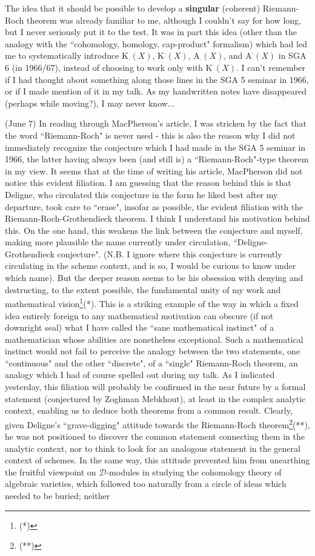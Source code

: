 The idea that it should be possible to develop a \textbf{singular} (coherent) Riemann-Roch theorem was already familiar to me, although I couldn't say for how long, but I never seriously put it to the test. It was in part this idea (other than the analogy with the ``cohomology, homology, cap-product" formalism) which had led me to systematically introduce $\text{K}_\cdot(X)$, $\text{K}^\cdot(X)$, $\text{A}_\cdot(X)$, and $\text{A}^\cdot(X)$  in SGA 6 (in 1966/67), instead of choosing to work only with $\text{K}^\cdot(X)$. I can't remember if I had thought about something along those lines in the SGA 5 seminar in 1966, or if I made mention of it in my talk. As my handwritten notes have disappeared (perhaps while moving?), I may never know...

(June 7) In reading through MacPherson's article, I was stricken by the fact that the word ``Riemann-Roch" is never used - this is also the reason why I did not immediately recognize the conjecture which I had made in the SGA 5 seminar in 1966, the latter having always been (and still is) a ``Riemann-Roch"-type theorem in my view. It seems that at the time of writing his article, MacPherson did not notice this evident filiation. I am guessing that the reason behind this is that Deligne, who circulated this conjecture in the form he liked best after my departure, took care to ``erase", insofar as possible, the evident filiation with the Riemann-Roch-Grothendieck theorem. I think I understand his motivation behind this. On the one hand, this weakens the link between the conjecture and myself, making more plausible  the name currently under circulation, ``Deligne-Grothendieck conjecture". (N.B. I ignore where this conjecture is currently circulating in the scheme context, and is so, I would be curious to know under which name). But the deeper reason seems to be his obsession with denying and destructing, to the extent possible, the fundamental unity of my work and mathematical vision\footnote{(*)}(*). This is a striking example of the way in which a fixed idea entirely foreign to any mathematical motivation can obscure (if not downright seal) what I have called the ``sane mathematical instinct" of a mathematician whose abilities are nonetheless exceptional. Such a mathematical instinct would not fail to perceive the analogy between the two statements, one ``continuous" and the other ``discrete", of a ``single" Riemann-Roch theorem, an analogy which I had of course spelled out during my talk. As I indicated yesterday, this filiation will probably be confirmed in the near future by a formal statement (conjectured by Zoghman Mebkhout), at least in the complex analytic context, enabling us to deduce both theorems from a common result. Clearly, given Deligne's ``grave-digging" attitude towards the Riemann-Roch theorem\footnote{(**)}(**), he was not positioned to discover the common statement connecting them in the analytic context, nor to think to look for an analogous statement in the general context of schemes. In the same way, this attitude prevented him from unearthing the fruitful viewpoint on $\mathcal{D}$-modules in studying the cohomology theory of algebraic varieties, which followed too naturally from a circle of ideas which needed to be buried; neither 